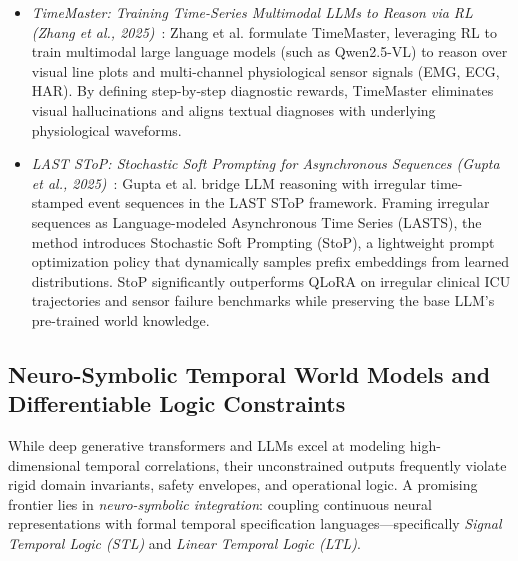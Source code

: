 \begin{itemize}[leftmargin=*]
    \item \emph{TimeMaster: Training Time-Series Multimodal LLMs to Reason via RL (Zhang et al., 2025)}~\cite{zhang2025timemaster}: Zhang et al. formulate TimeMaster, leveraging RL to train multimodal large language models (such as Qwen2.5-VL) to reason over visual line plots and multi-channel physiological sensor signals (EMG, ECG, HAR). By defining step-by-step diagnostic rewards, TimeMaster eliminates visual hallucinations and aligns textual diagnoses with underlying physiological waveforms.
    \item \emph{LAST SToP: Stochastic Soft Prompting for Asynchronous Sequences (Gupta et al., 2025)}~\cite{gupta2025laststop}: Gupta et al. bridge LLM reasoning with irregular time-stamped event sequences in the LAST SToP framework. Framing irregular sequences as Language-modeled Asynchronous Time Series (LASTS), the method introduces Stochastic Soft Prompting (StoP), a lightweight prompt optimization policy that dynamically samples prefix embeddings from learned distributions. StoP significantly outperforms QLoRA on irregular clinical ICU trajectories and sensor failure benchmarks while preserving the base LLM's pre-trained world knowledge.
\end{itemize}

\subsection{Neuro-Symbolic Temporal World Models and Differentiable Logic Constraints}
\label{sec:neuro_symbolic_logic}

While deep generative transformers and LLMs excel at modeling high-dimensional temporal correlations, their unconstrained outputs frequently violate rigid domain invariants, safety envelopes, and operational logic. A promising frontier lies in \emph{neuro-symbolic integration}: coupling continuous neural representations with formal temporal specification languages—specifically \emph{Signal Temporal Logic (STL)} and \emph{Linear Temporal Logic (LTL)}. 

